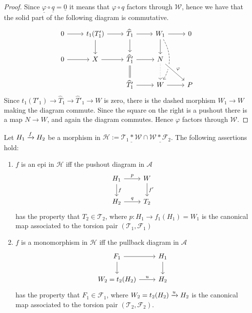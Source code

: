 \begin{proof}
  Since $\underline{\varphi}\circ\underline{q}=\underline{0}$ it means that $\varphi\circ q$ factors through $\mathcal{W}$, hence we
  have that the solid part of the following diagram is commutative.
  \begin{equation*}
    \begin{tikzcd}
      0\arrow{r}
        & t_1(T'_1)\arrow{r}\arrow{d}
          & \widehat{T}_1\arrow{r}\arrow{d}
            & W_1\arrow{r}\arrow{d}\arrow[bend left, dashed]{dd}
              & 0\\
      0\arrow{r}
        & X\arrow{r}
          & \widehat{T}'_1\arrow{r}\arrow[equal]{d}
            & N\arrow[crossing over]{dr}{\varphi}\arrow[dotted]{d}
              &\\
        & & \widehat{T}'_1\arrow{r}
            & W\arrow{r}
              & P
    \end{tikzcd}
  \end{equation*}
  Since $t_1(T'_1)\to \widehat{T}_1\to \widehat{T}'_1\to W$ is zero, there is the dashed morphism $W_1\to W$ making the
  diagram commute. Since the square on the right is a pushout there is a map $N\to W$, and again the diagram commutes.
  Hence $\varphi$ factors through $\mathcal{W}$.
\end{proof}

\begin{lemma}\label{ab:lem:7}
  Let $H_1\xrightarrow{f}H_2$ be a morphism in
  $\mathcal{H}:=\underline{\mathcal{T}_1\ast\mathcal{W}}\cap
  \underline{\mathcal{W}\ast\mathcal{F}_2}$. The following assertions hold:
  \begin{enumerate}
    \item $f$ is an epi in $\mathcal{H}$ iff the pushout diagram in $\mathcal{A}$
    \begin{equation*}
      \begin{tikzcd}
        H_1\arrow{r}{p}\arrow{d}{f}
          & W\arrow{d}{f'}\\
        H_2\arrow{r}{q}
          & T_2
      \end{tikzcd}
    \end{equation*}
    has the property that $T_2\in\mathcal{T}_2$, where $p:H_1\to f_1(H_1)=W_1$ is the canonical
    map associated to the torsion pair $(\mathcal{T}_1,\mathcal{F}_1)$
    \item $f$ is a monomorphism in $\mathcal{H}$ iff the pullback diagram in $\mathcal{A}$
    \begin{equation*}
      \begin{tikzcd}
        F_1\arrow{r}\arrow{d}
          & H_1\arrow{d}\\
        W_2=t_2(H_2)\arrow{r}{u}
          & H_2
      \end{tikzcd}
    \end{equation*}
    has the property that $F_1\in\mathcal{F}_1$, where $W_2=t_2(H_2)\xrightarrow{u}H_2$ is the
    canonical map associated to the torsion pair $(\mathcal{T}_2,\mathcal{F}_2)$.
  \end{enumerate}
\end{lemma}

